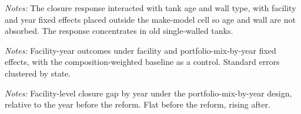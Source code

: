\documentclass[
  12pt,
]{article}
\begin{document}
\clearpage
\null\vfill
\begin{center}
\label{tbl-risk-conc}
\vspace{6pt}
\par\vspace{10pt}
\begin{minipage}{0.85\textwidth}\small\textit{Notes:} The closure response interacted with tank age and wall type, with facility and year fixed effects placed outside the make-model cell so age and wall are not absorbed. The response concentrates in old single-walled tanks.\end{minipage}
\end{center}
\vfill\clearpage

\clearpage
\null\vfill
\begin{center}
\label{tbl-fac-att}
\vspace{6pt}
\par\vspace{10pt}
\begin{minipage}{0.85\textwidth}\small\textit{Notes:} Facility-year outcomes under facility and portfolio-mix-by-year fixed effects, with the composition-weighted baseline as a control. Standard errors clustered by state.\end{minipage}
\end{center}
\vfill\clearpage

\clearpage
\null\vfill
\begin{center}
\label{fig-es-fac}
\par\vspace{8pt}
\par\vspace{8pt}
\begin{minipage}{0.85\textwidth}\small\textit{Notes:} Facility-level closure gap by year under the portfolio-mix-by-year design, relative to the year before the reform. Flat before the reform, rising after.\end{minipage}
\end{center}
\vfill\clearpage
\end{document}
